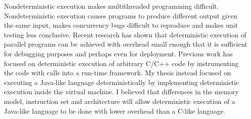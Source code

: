 \begin{abstractpage}
  Nondeterministic execution makes multithreaded programming
  difficult.  Nondeterministic execution causes programs to produce
  different output given the same input, makes concurrency bugs
  difficult to reproduce and makes unit testing less conclusive.
  Recent research has shown that deterministic execution of parallel
  programs can be achieved with overhead small enough that it is
  sufficient for debugging purposes and perhaps even for deployment.
  Previous work has focused on deterministic execution of arbitrary
  C/C++ code by instrumenting the code with calls into a run-time
  framework.  My thesis instead focused on executing a Java-like
  language deterministically by implementing deterministic execution
  inside the virtual machine.  I believed that differences in the
  memory model, instruction set and architecture will allow
  deterministic execution of a Java-like language to be done with
  lower overhead than a C-like language.
\end{abstractpage}
